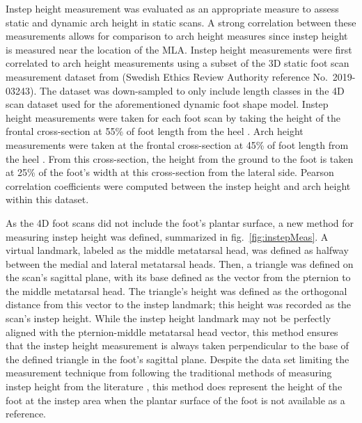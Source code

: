 \documentclass[defaultstyle,11pt]{thesis}
\begin{document}
Instep height measurement was evaluated as an appropriate measure to assess static and dynamic arch height in static scans.
A strong correlation between these measurements allows for comparison to arch height measures since instep height is measured near the location of the MLA.
Instep height measurements were first correlated to arch height measurements using a subset of the 3D static foot scan measurement dataset from \citep{Jurca2019} (Swedish Ethics Review Authority reference No.~2019-03243).
The dataset was down-sampled to only include length classes in the 4D scan dataset used for the aforementioned dynamic foot shape model.
Instep height measurements were taken for each foot scan by taking the height of the frontal cross-section at 55\% of foot length from the heel \citep{Jurca2019}.
Arch height measurements were taken at the frontal cross-section at 45\% of foot length from the heel \citep{Jurca2019}.
From this cross-section, the height from the ground to the foot is taken at 25\% of the foot's width at this cross-section from the lateral side.
Pearson correlation coefficients were computed between the instep height and arch height within this dataset.

As the 4D foot scans did not include the foot's plantar surface, a new method for measuring instep height was defined, summarized in fig.~\ref{fig:instepMeas}.
A virtual landmark, labeled as the middle metatarsal head, was defined as halfway between the medial and lateral metatarsal heads.
Then, a triangle was defined on the scan's sagittal plane, with its base defined as the vector from the pternion to the middle metatarsal head.
The triangle's height was defined as the orthogonal distance from this vector to the instep landmark; this height was recorded as the scan's instep height.
While the instep height landmark may not be perfectly aligned with the pternion-middle metatarsal head vector, this method ensures that the instep height measurement is always taken perpendicular to the base of the defined triangle in the foot's sagittal plane.
Despite the data set limiting the measurement technique from following the traditional methods of measuring instep height from the literature \citep{Jurca2019}, this method does represent the height of the foot at the instep area when the plantar surface of the foot is not available as a reference.
\end{document}
